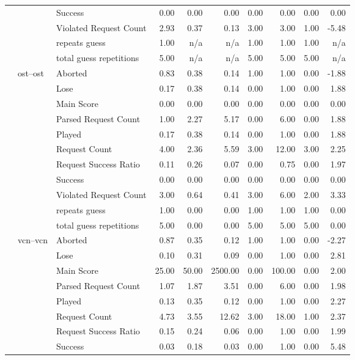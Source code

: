 \begin{tabular}{lllrrrrrrr}
 &  & Success & 0.00 & 0.00 & 0.00 & 0.00 & 0.00 & 0.00 & 0.00 \\
 &  & Violated Request Count & 2.93 & 0.37 & 0.13 & 3.00 & 3.00 & 1.00 & -5.48 \\
 &  & repeats guess & 1.00 & n/a & n/a & 1.00 & 1.00 & 1.00 & n/a \\
 &  & total guess repetitions & 5.00 & n/a & n/a & 5.00 & 5.00 & 5.00 & n/a \\
\cline{2-10}
 & \multirow[t]{11}{*}{ost--ost} & Aborted & 0.83 & 0.38 & 0.14 & 1.00 & 1.00 & 0.00 & -1.88 \\
 &  & Lose & 0.17 & 0.38 & 0.14 & 0.00 & 1.00 & 0.00 & 1.88 \\
 &  & Main Score & 0.00 & 0.00 & 0.00 & 0.00 & 0.00 & 0.00 & 0.00 \\
 &  & Parsed Request Count & 1.00 & 2.27 & 5.17 & 0.00 & 6.00 & 0.00 & 1.88 \\
 &  & Played & 0.17 & 0.38 & 0.14 & 0.00 & 1.00 & 0.00 & 1.88 \\
 &  & Request Count & 4.00 & 2.36 & 5.59 & 3.00 & 12.00 & 3.00 & 2.25 \\
 &  & Request Success Ratio & 0.11 & 0.26 & 0.07 & 0.00 & 0.75 & 0.00 & 1.97 \\
 &  & Success & 0.00 & 0.00 & 0.00 & 0.00 & 0.00 & 0.00 & 0.00 \\
 &  & Violated Request Count & 3.00 & 0.64 & 0.41 & 3.00 & 6.00 & 2.00 & 3.33 \\
 &  & repeats guess & 1.00 & 0.00 & 0.00 & 1.00 & 1.00 & 1.00 & 0.00 \\
 &  & total guess repetitions & 5.00 & 0.00 & 0.00 & 5.00 & 5.00 & 5.00 & 0.00 \\
\cline{2-10}
 & \multirow[t]{11}{*}{vcn--vcn} & Aborted & 0.87 & 0.35 & 0.12 & 1.00 & 1.00 & 0.00 & -2.27 \\
 &  & Lose & 0.10 & 0.31 & 0.09 & 0.00 & 1.00 & 0.00 & 2.81 \\
 &  & Main Score & 25.00 & 50.00 & 2500.00 & 0.00 & 100.00 & 0.00 & 2.00 \\
 &  & Parsed Request Count & 1.07 & 1.87 & 3.51 & 0.00 & 6.00 & 0.00 & 1.98 \\
 &  & Played & 0.13 & 0.35 & 0.12 & 0.00 & 1.00 & 0.00 & 2.27 \\
 &  & Request Count & 4.73 & 3.55 & 12.62 & 3.00 & 18.00 & 1.00 & 2.37 \\
 &  & Request Success Ratio & 0.15 & 0.24 & 0.06 & 0.00 & 1.00 & 0.00 & 1.99 \\
 &  & Success & 0.03 & 0.18 & 0.03 & 0.00 & 1.00 & 0.00 & 5.48 \\

\end{tabular}
